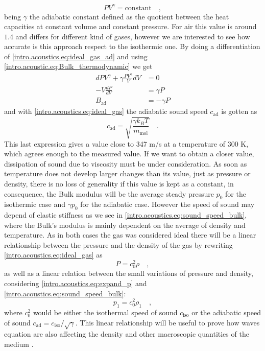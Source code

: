 \begin{equation}\label{intro.acoustics.eq:ideal_gas_ad}
    PV^\gamma = \text{constant}\quad,
\end{equation}
being $\gamma$ the adiabatic constant defined as the quotient between the heat capacities at constant volume and constant pressure. For air this value is around $1.4$ and differs for different kind of gases, however we are interested to see how accurate is this approach respect to the isothermic one. By doing a differentiation of \ref{intro.acoustics.eq:ideal_gas_ad} and using \ref{intro.acoustic.eq:Bulk_thermodynamic} we get
\begin{align}
    dPV^\gamma + \gamma\frac{PV^\gamma}{V}dV &= 0 \nonumber\\
    -V\frac{dP}{dV} &= \gamma P \\
    B_{\text{ad}} &= -\gamma P\label{intro.acoustics.eq:ad_bulk}
\end{align}
and with \ref{intro.acoustics.eq:ideal_gas} the adiabatic sound speed $c_{\text{ad}}$ is gotten as
\begin{equation}\label{intro.acoustics.eq:ad_sound_speed}
    c_{\text{ad}} = \sqrt{\frac{\gamma k_B T}{m_\text{mol}}}\quad.
\end{equation}
This last expression gives a value close to 347 m/s at a temperature of 300 K, which agrees enough to the measured value. If we want to obtain a closer value, dissipation of sound due to viscosity must be under consideration. As soon as temperature does not develop larger changes than its value, just as pressure or density, there is no loss of generality if this value is kept as a constant, in consequence, the Bulk modulus will be the average steady pressure $p_0$ for the isothermic case and $\gamma p_0$ for the adiabatic case. However the speed of sound may depend of elastic stiffness as we see in \ref{intro.acoustics.eq:sound_speed_bulk}, where the Bulk's modulus is mainly dependent on the average of density and temperature. As in both cases the gas was considered ideal there will be a linear relationship between the pressure and the density of the gas by rewriting \ref{intro.acoustics.eq:ideal_gas} as
\begin{equation}\label{intro.acoustics.eq:linear_P_total_rho}
    P = c_0^2\rho\quad,
\end{equation}
as well as a linear relation between the small variations of pressure and density, considering \ref{intro.acoustics.eq:expand_p} and \ref{intro.acoustics.eq:sound_speed_bulk}:
\begin{equation}\label{intro.acoustics.eq:linear_p_rho}
    p_1 = c_0^2\rho_1\quad,
\end{equation}
where $c_0^2$ would be either the isothermal speed of sound $c_{\text{iso}}$ or the adiabatic speed of sound $c_{\text{ad}} = c_{\text{iso}}/\sqrt{\gamma}$. This linear relationship will be useful to prove how waves equation are also affecting the density and other macroscopic quantities of the medium \cite[p.~139-142]{Elmore}.\\ 

